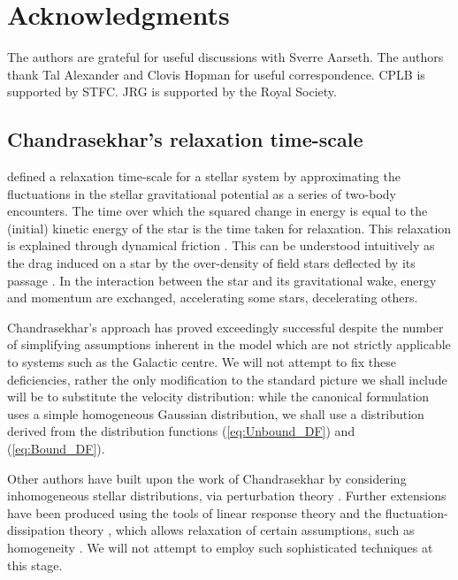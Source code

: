 \documentclass[useAMS,usedcolumn,usegraphicx,usenatbib]{mn2e}
\newcommand{\eqnref}[1]{(\ref{eq:#1})}
\begin{document}
\section*{Acknowledgments}
The authors are grateful for useful discussions with Sverre Aarseth. The authors thank Tal Alexander and Clovis Hopman for useful correspondence. CPLB is supported by STFC. JRG is supported by the Royal Society.




\appendix

\begin{onecolumn}

\section{Chandrasekhar's relaxation time-scale}\label{sec:time-scale}

\citet[chapter 2]{Chandrasekhar1960} defined a relaxation time-scale for a stellar system by approximating the fluctuations in the stellar gravitational potential as a series of two-body encounters. The time over which the squared change in energy is equal to the (initial) kinetic energy of the star is the time taken for relaxation. This relaxation is explained through dynamical friction \citep{Chandrasekhar1943a, Binney1987}. This can be understood intuitively as the drag induced on a star by the over-density of field stars deflected by its passage \citep{Mulder1983}. In the interaction between the star and its gravitational wake, energy and momentum are exchanged, accelerating some stars, decelerating others.

Chandrasekhar's approach has proved exceedingly successful despite the number of simplifying assumptions inherent in the model which are not strictly applicable to systems such as the Galactic centre. We will not attempt to fix these deficiencies, rather the only modification to the standard picture we shall include will be to substitute the velocity distribution: while the canonical formulation uses a simple homogeneous Gaussian distribution, we shall use a distribution derived from the distribution functions \eqnref{Unbound_DF} and \eqnref{Bound_DF}.

Other authors have built upon the work of Chandrasekhar by considering inhomogeneous stellar distributions, via perturbation theory \citep{Lynden-Bell1972,Tremaine1984,Weinberg1986}. Further extensions have been produced using the tools of linear response theory and the fluctuation-dissipation theory \citep[chapter 7]{Landau1958}, which allows relaxation of certain assumptions, such as homogeneity \citep{Bekenstein1992,Maoz1993,Nelson1999}. We will not attempt to employ such sophisticated techniques at this stage.


\end{onecolumn}
\end{document}
